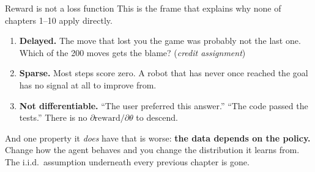 \documentclass[aspectratio=169]{beamer}
\begin{document}
\begin{frame}{Reward is not a loss function}
  This is the frame that explains why none of chapters 1--10 apply directly.

  \vskip 6pt
  \begin{tcolorbox}[colback=armred!8, colframe=armred, boxrule=0.6pt, arc=2pt,
                    title={\textbf{Three properties a loss does not have}}]
    \small
    \begin{enumerate}\itemsep3pt
      \item \textbf{Delayed.} The move that lost you the game was probably not the last one.
            Which of the 200 moves gets the blame? (\emph{credit assignment})
      \item \textbf{Sparse.} Most steps score zero. A robot that has never once reached the
            goal has no signal at all to improve from.
      \item \textbf{Not differentiable.} ``The user preferred this answer.'' ``The code passed
            the tests.'' There is no $\partial \text{reward} / \partial \theta$ to descend.
    \end{enumerate}
  \end{tcolorbox}

  \vskip 6pt
  \begin{tcolorbox}[colback=paramgreen!8, colframe=paramgreen, boxrule=0.6pt, arc=2pt]
    \small
    And one property it \emph{does} have that is worse: \textbf{the data depends on the policy.}
    Change how the agent behaves and you change the distribution it learns from. The i.i.d.\
    assumption underneath every previous chapter is gone.
  \end{tcolorbox}
\end{frame}
\end{document}
